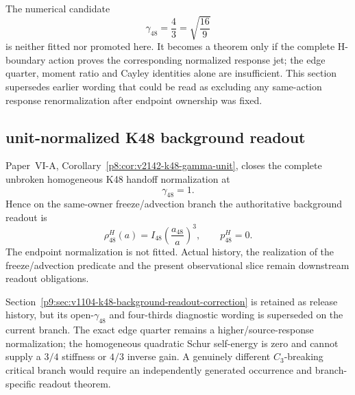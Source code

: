 \documentclass[12pt,a4paper]{article}
\begin{document}
\begin{remark}
\label{p9:rem:v1104-k48-four-thirds-diagnostic}
The numerical candidate
\[
 \gamma_{48}=\frac43=\sqrt{\frac{16}{9}}
\]
is neither fitted nor promoted here.  It becomes a theorem only if the
complete H-boundary action proves the corresponding normalized response jet;
the edge quarter, moment ratio and Cayley identities alone are insufficient.
This section supersedes earlier wording that could be read as excluding any
same-action response renormalization after endpoint ownership was fixed.
\end{remark}

\subsection{unit-normalized K48 background readout}
\label{p9:sec:v1105-k48-unit-background-readout}

\begin{corollary}
\label{p9:cor:v1105-k48-unit-background-readout}
Paper~VI-A, Corollary~\ref{p8:cor:v2142-k48-gamma-unit}, closes the complete
unbroken homogeneous K48 handoff normalization at
\[
 \boxed{\gamma_{48}=1.}
\]
Hence on the same-owner freeze/advection branch the authoritative background
readout is
\[
 \boxed{
 \rho_{48}^{H}(a)=I_{48}\left(\frac{a_{48}}a\right)^3,
 \qquad p_{48}^{H}=0.}
\]
The endpoint normalization is not fitted.  Actual history, the realization of
the freeze/advection predicate and the present observational slice remain
downstream readout obligations.
\end{corollary}

\begin{remark}
\label{p9:rem:v1105-k48-four-thirds-retired}
Section~\ref{p9:sec:v1104-k48-background-readout-correction} is retained as
release history, but its open-$\gamma_{48}$ and four-thirds diagnostic wording
is superseded on the current branch.  The exact edge quarter remains a
higher/source-response normalization; the homogeneous quadratic Schur
self-energy is zero and cannot supply a $3/4$ stiffness or $4/3$ inverse gain.
A genuinely different $C_3$-breaking critical branch would require an
independently generated occurrence and branch-specific readout theorem.
\end{remark}
\end{document}
